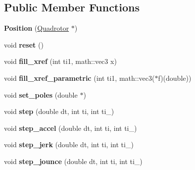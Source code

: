 \subsection*{\-Public \-Member \-Functions}
\begin{DoxyCompactItemize}
\item 
\hypertarget{classPosition_a21dc157ba98b5d2611370bf3f349736a}{{\bfseries \-Position} (\hyperlink{classQuadrotor}{\-Quadrotor} $\ast$)}\label{classPosition_a21dc157ba98b5d2611370bf3f349736a}

\item 
\hypertarget{classPosition_a3edff02174569169d30df5b451eebda0}{void {\bfseries reset} ()}\label{classPosition_a3edff02174569169d30df5b451eebda0}

\item 
\hypertarget{classPosition_a924a092bf7875bdbcdc2e82003f4a115}{void {\bfseries fill\-\_\-xref} (int ti1, math\-::vec3 x)}\label{classPosition_a924a092bf7875bdbcdc2e82003f4a115}

\item 
\hypertarget{classPosition_a7dcec18ff9b16b1f239ff4b2186af9da}{void {\bfseries fill\-\_\-xref\-\_\-parametric} (int ti1, math\-::vec3($\ast$f)(double))}\label{classPosition_a7dcec18ff9b16b1f239ff4b2186af9da}

\item 
\hypertarget{classPosition_aba6365e7fe72d0640ad071c804099b34}{void {\bfseries set\-\_\-poles} (double $\ast$)}\label{classPosition_aba6365e7fe72d0640ad071c804099b34}

\item 
\hypertarget{classPosition_a6953d71c48f37e8e761ee97a127e1187}{void {\bfseries step} (double dt, int ti, int ti\-\_)}\label{classPosition_a6953d71c48f37e8e761ee97a127e1187}

\item 
\hypertarget{classPosition_a0f0e34c5613c19185eccd70e61208dfd}{void {\bfseries step\-\_\-accel} (double dt, int ti, int ti\-\_)}\label{classPosition_a0f0e34c5613c19185eccd70e61208dfd}

\item 
\hypertarget{classPosition_a61b9bee4144b6561f6f4bcdf7450033c}{void {\bfseries step\-\_\-jerk} (double dt, int ti, int ti\-\_)}\label{classPosition_a61b9bee4144b6561f6f4bcdf7450033c}

\item 
\hypertarget{classPosition_aba8e066dbbecd1884a25a7805b497b74}{void {\bfseries step\-\_\-jounce} (double dt, int ti, int ti\-\_)}\label{classPosition_aba8e066dbbecd1884a25a7805b497b74}


\end{DoxyCompactItemize}
